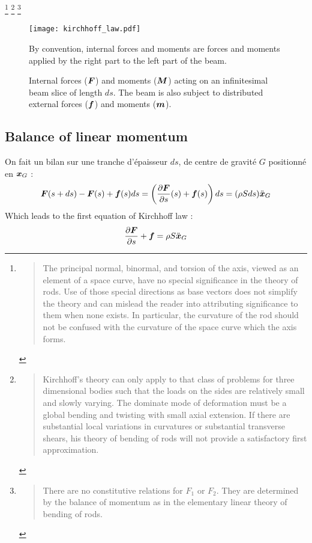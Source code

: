 \footnote{\blockcquote[p.5]{Dill1992}{The principal normal, binormal, and torsion of the axis, viewed as an element of a space curve, have no special significance in the theory of rods. Use of those special directions as base vectors does not simplify the theory and can mislead the reader into attributing significance to them when none exists. In particular, the curvature of the rod should not be confused with the curvature of the space curve which the axis forms.}}
\footnote{\blockcquote[p.18]{Dill1992}{Kirchhoff's theory can only apply to that class of problems for three dimensional bodies such that the loads on the sides are relatively small and slowly varying. The dominate mode of deformation must be a global bending and twisting with small axial extension. If there are substantial local variations in curvatures or substantial transverse shears, his theory of bending of rods will not provide a satisfactory first approximation.}}
\footnote{\blockcquote[p.15]{Dill1992}{There are no constitutive relations for $F_1$ or $F_2$. They are determined by the balance of momentum as in the elementary linear theory of bending of rods.}}

\begin{figure}[t]
	\centering
	\texttt{[image: kirchhoff\_law.pdf]}
	\caption{Internal forces ($\boldsymbol{F}$) and moments ($\boldsymbol{M}$) acting on an infinitesimal beam slice of length $ds$. The beam is also subject to distributed external forces ($\boldsymbol{f}$) and moments ($\boldsymbol{m}$).} By convention, internal forces and moments are forces and moments applied by the right part to the left part of the beam.
	\label{fig:5_0}
\end{figure}

\subsection{Balance of linear momentum}
On fait un bilan sur une tranche d'épaisseur $ds$, de centre de gravité $G$ positionné en $\boldsymbol{x}_G$ :
\begin{equation}
	\boldsymbol{F}(s+ds)-\boldsymbol{F}(s) + \boldsymbol{f}(s)ds = \left(\frac{\partial \boldsymbol{F}}{\partial s}(s)+\boldsymbol{f}(s)\right)ds = (\rho Sds)\ddot{\boldsymbol{x}}_G
\end{equation}
Which leads to the first equation of Kirchhoff law :
\begin{equation}
	\frac{\partial \boldsymbol{F}}{\partial s}+\boldsymbol{f} = \rho S \ddot{\boldsymbol{x}}_G
\end{equation}

